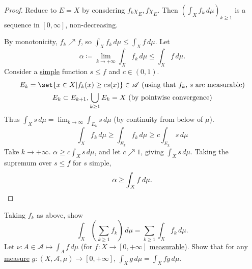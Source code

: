 \documentclass[twoside]{article}
\begin{document}
\begin{proof}
    Reduce to $E = X$ by consdering $f_k \chi_E, f \chi_E$.
    Then $\left(\int_X f_k \, d\mu\right)_{k \geq 1}$ is a sequence in $[0, \infty]$, non-decreasing.

    By monotonicity, $f_k \nearrow f$, so $\int_X f_k \, d\mu \leq \int_X f \, d\mu$.
    Let
    \begin{equation*}
        \alpha \coloneqq \lim_{k \to +\infty} \int_X f_k \, d\mu \leq \int_X f \, d\mu.
    \end{equation*}
    Consider a \hyperlink{def:simple}{simple} function $s \leq f$ and $c \in (0, 1)$.
    \begin{gather*}
        E_k = \set{x\in X | f_k(x) \geq c s(x)} \in \mathscr{A} \text{ (using that $f_k$, $s$ are measurable)}\\
        E_k \subset E_{k+1}, \bigcup_{k \geq 1} E_k = X \text{ (by pointwise convergence)}
    \end{gather*}
    Thus $\int_X s \, d\mu = \lim_{k \to \infty} \int_{E_k} s \, d\mu$ (by continuity from below of $\mu$).
    \begin{equation*}
        \int_X f_k \, d\mu \geq \int_{E_k} f_k \, d \mu \geq c \int_{E_k} s \, d \mu
    \end{equation*}
    Take $k \to +\infty$. $\alpha \geq c \int_X s \, d\mu$, and let $c \nearrow 1$, giving $\int_X s \, d\mu$.
    Taking the supremum over $s \leq f$ for $s$ simple,
    \begin{equation*}
        \alpha \geq \int_X f \, d\mu.\qedhere
    \end{equation*}
\end{proof}

\begin{ex}
    Taking $f_k$ as above, show
    \begin{equation*}
        \int_X \left(\sum_{k \geq 1} f_k\right) \, d\mu = \sum_{k \geq 1} \int_X f_k \, d\mu.
    \end{equation*}
    Let $\nu: A \in \mathscr{A} \mapsto \int_A f \, d\mu$ (for $f: X \to [0, +\infty]$ \hyperlink{def:measFunc}{measurable}).
    Show that for any \hyperlink{def:measure}{measure} $g: (X, \mathscr{A}, \mu) \to [0, +\infty]$, $\int_X g \, d\mu = \int_X fg \, d\mu$.
\end{ex}
\end{document}
